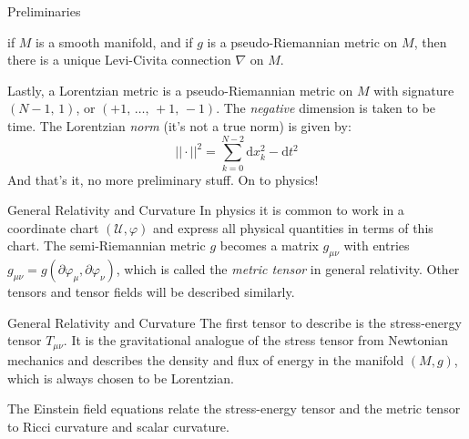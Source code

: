 \documentclass{beamer}
\begin{document}
    \begin{frame}{Preliminaries}
        \begin{theorem}
            if $M$ is a smooth manifold, and if $g$ is a pseudo-Riemannian
            metric on $M$, then there is a unique Levi-Civita connection
            $\nabla$ on $M$.
        \end{theorem}
        Lastly, a Lorentzian metric is a pseudo-Riemannian metric on $M$
        with signature $(N-1,\,1)$, or $(+1,\,\dots,\,+1,\,-1)$. The
        \textit{negative} dimension is taken to be time. The Lorentzian
        \textit{norm} (it's not a true norm) is given by:
        \begin{equation}
            ||\cdot||^{2}=\sum_{k=0}^{N-2}\textrm{d}x_{k}^{2}-\textrm{d}t^{2}
        \end{equation}
        And that's it, no more preliminary stuff. On to physics!
    \end{frame}
    \begin{frame}{General Relativity and Curvature}
        In physics it is common to work in a coordinate chart
        $(\mathcal{U},\varphi)$ and express all physical quantities in terms of
        this chart. The semi-Riemannian metric $g$ becomes a matrix
        $g_{\mu\nu}$ with entries
        $g_{\mu\nu}=g(\partial\varphi_{\mu},\partial\varphi_{\nu})$, which is
        called the \textit{metric tensor} in general relativity. Other tensors
        and tensor fields will be described similarly.
    \end{frame}
    \begin{frame}{General Relativity and Curvature}
        The first tensor to describe is the stress-energy tensor $T_{\mu\nu}$.
        It is the gravitational analogue of the stress tensor from Newtonian
        mechanics and describes the density and flux of energy in the
        manifold $(M,g)$, which is always chosen to be Lorentzian.
        \par\hfill\par
        The Einstein field equations relate the stress-energy tensor and the
        metric tensor to Ricci curvature and scalar curvature.
    \end{frame}
\end{document}

